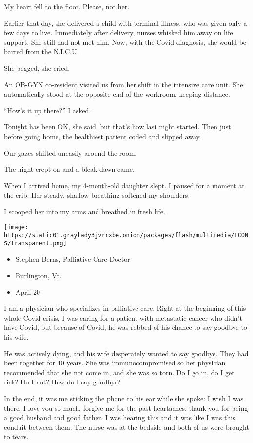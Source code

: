 My heart fell to the floor. Please, not her.

Earlier that day, she delivered a child with terminal illness, who was
given only a few days to live. Immediately after delivery, nurses
whisked him away on life support. She still had not met him. Now, with
the Covid diagnosis, she would be barred from the N.I.C.U.

She begged, she cried.

An OB-GYN co-resident visited us from her shift in the intensive care
unit. She automatically stood at the opposite end of the workroom,
keeping distance.

``How's it up there?'' I asked.

Tonight has been OK, she said, but that's how last night started. Then
just before going home, the healthiest patient coded and slipped away.

Our gazes shifted uneasily around the room.

The night crept on and a bleak dawn came.

When I arrived home, my 4-month-old daughter slept. I paused for a
moment at the crib. Her steady, shallow breathing softened my shoulders.

I scooped her into my arms and breathed in fresh life.

\texttt{[image: https://static01.graylady3jvrrxbe.onion/packages/flash/multimedia/ICONS/transparent.png]}

\begin{itemize}
\tightlist
\item
  Stephen Berns, Palliative Care Doctor
\item
  Burlington, Vt.
\item
  April 20
\end{itemize}

I am a physician who specializes in palliative care. Right at the
beginning of this whole Covid crisis, I was caring for a patient with
metastatic cancer who didn't have Covid, but because of Covid, he was
robbed of his chance to say goodbye to his wife.

He was actively dying, and his wife desperately wanted to say goodbye.
They had been together for 40 years. She was immunocompromised so her
physician recommended that she not come in, and she was so torn. Do I go
in, do I get sick? Do I not? How do I say goodbye?

In the end, it was me sticking the phone to his ear while she spoke: I
wish I was there, I love you so much, forgive me for the past
heartaches, thank you for being a good husband and good father. I was
hearing this and it was like I was this conduit between them. The nurse
was at the bedside and both of us were brought to tears.

